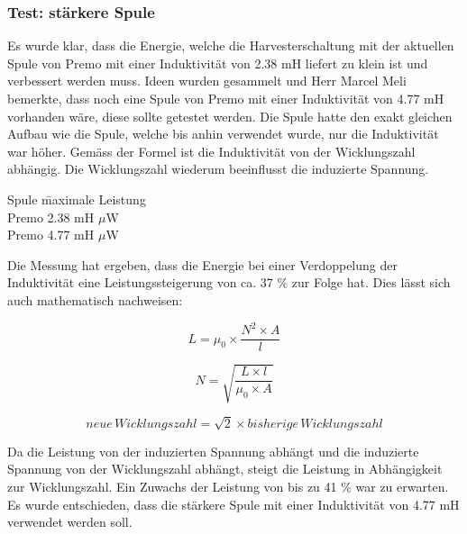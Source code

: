 \subsubsection{Test: stärkere Spule}

Es wurde klar, dass die Energie, welche die Harvesterschaltung mit der aktuellen Spule von Premo mit einer Induktivität von 2.38 mH liefert zu klein ist und verbessert werden muss. Ideen wurden gesammelt und Herr Marcel Meli bemerkte, dass noch eine Spule von Premo mit einer Induktivität von 4.77 mH vorhanden wäre, diese sollte getestet werden. Die Spule hatte den exakt gleichen Aufbau wie die Spule, welche bis anhin verwendet wurde, nur die Induktivität war höher. Gemäss der Formel \cite{equ_inductivity} ist die Induktivität von der Wicklungszahl abhängig. Die Wicklungszahl wiederum beeinflusst die induzierte Spannung.

\begin{tabbing}
    Spule\hspace{2cm}   \quad\= maximale Leistung    \\[0.8ex]
    Premo 2.38 mH         $\mu$W\\
	Premo 4.77 mH         $\mu$W\\
	
\end{tabbing}

Die Messung hat ergeben, dass die Energie bei einer Verdoppelung der Induktivität eine Leistungssteigerung von ca. 37 \% zur Folge hat. Dies lässt sich auch mathematisch nachweisen:

\begin{equation}
	L = \mu_0 \times \frac{N^2\times A}{l}
\end{equation}

\begin{equation}
	N = \sqrt{\frac{L\times l}{\mu_0\times A}}
\end{equation}

\begin{equation}
	neue\,Wicklungszahl = \sqrt{2} \times bisherige\,Wicklungszahl
\end{equation}

Da die Leistung von der induzierten Spannung abhängt und die induzierte Spannung von der Wicklungszahl abhängt, steigt die Leistung in Abhängigkeit zur Wicklungszahl. Ein Zuwachs der Leistung von bis zu 41 \% war zu erwarten. Es wurde entschieden, dass die stärkere Spule mit einer Induktivität von 4.77 mH verwendet werden soll.


